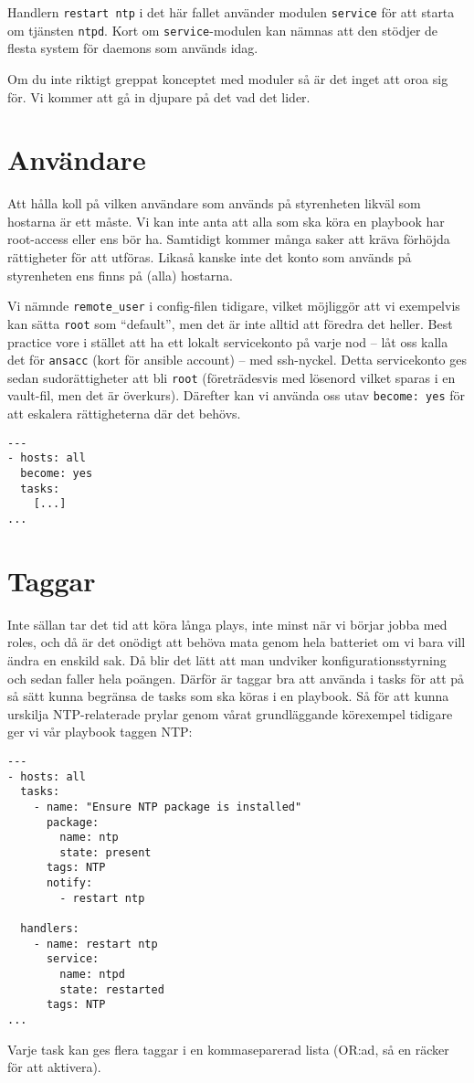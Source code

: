 Handlern \texttt{restart ntp} i det här fallet använder modulen \texttt{service} för att starta om tjänsten \texttt{ntpd}. Kort om \texttt{service}-modulen kan nämnas att den stödjer de flesta system för daemons som används idag.

Om du inte riktigt greppat konceptet med moduler så är det inget att oroa sig för. Vi kommer att gå in djupare på det vad det lider.

\section{Användare}
Att hålla koll på vilken användare som används på styrenheten likväl som hostarna är ett måste. Vi kan inte anta att
alla som ska köra en playbook har root-access eller ens bör ha. Samtidigt kommer många saker att kräva förhöjda 
rättigheter för att utföras. Likaså kanske inte det konto som används på styrenheten ens finns på (alla) hostarna.

Vi nämnde \texttt{remote\_user} i config-filen tidigare, vilket möjliggör att vi exempelvis kan sätta \texttt{root}
som ``default'', men det är inte alltid att föredra det heller. Best practice vore i stället att ha ett lokalt 
servicekonto på varje nod -- låt oss kalla det för \texttt{ansacc} (kort för ansible account) -- med ssh-nyckel.
Detta servicekonto ges sedan sudorättigheter att bli \texttt{root} (företrädesvis med lösenord vilket sparas i en
vault-fil, men det är överkurs). Därefter kan vi använda oss utav \texttt{become: yes} för att eskalera rättigheterna där det behövs.

\begin{verbatim}
---
- hosts: all
  become: yes
  tasks:
    [...]
...
\end{verbatim}

\section{Taggar}
Inte sällan tar det tid att köra långa plays, inte minst när vi börjar jobba med roles, och då är det onödigt att
behöva mata genom hela batteriet om vi bara vill ändra en enskild sak. Då blir det lätt att man undviker 
konfigurationsstyrning och sedan faller hela poängen. Därför är taggar bra att använda i tasks för att på så sätt
kunna begränsa de tasks som ska köras i en playbook. Så för att kunna urskilja NTP-relaterade prylar genom vårat 
grundläggande körexempel tidigare ger vi vår playbook taggen NTP:

\begin{verbatim}
---
- hosts: all
  tasks:
    - name: "Ensure NTP package is installed"
      package:
        name: ntp
        state: present
      tags: NTP
      notify:
        - restart ntp

  handlers:
    - name: restart ntp
      service:
        name: ntpd
        state: restarted
      tags: NTP
...
\end{verbatim}

Varje task kan ges flera taggar i en kommaseparerad lista (OR:ad, så en räcker för att aktivera).
